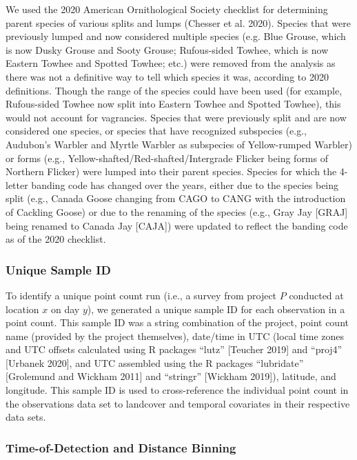 \documentclass[]{article}
\begin{document}
We used the 2020 American Ornithological Society checklist for determining parent species of various splits and lumps (Chesser et al. 2020). Species that were previously lumped and now considered multiple species (e.g. Blue Grouse, which is now Dusky Grouse and Sooty Grouse; Rufous-sided Towhee, which is now Eastern Towhee and Spotted Towhee; etc.) were removed from the analysis as there was not a definitive way to tell which species it was, according to 2020 definitions. Though the range of the species could have been used (for example, Rufous-sided Towhee now split into Eastern Towhee and Spotted Towhee), this would not account for vagrancies. Species that were previously split and are now considered one species, or species that have recognized subspecies (e.g., Audubon’s Warbler and Myrtle Warbler as subspecies of Yellow-rumped Warbler) or forms (e.g., Yellow-shafted/Red-shafted/Intergrade Flicker being forms of Northern Flicker) were lumped into their parent species. Species for which the 4-letter banding code has changed over the years, either due to the species being split (e.g., Canada Goose changing from CAGO to CANG with the introduction of Cackling Goose) or due to the renaming of the species (e.g., Gray Jay [GRAJ] being renamed to Canada Jay [CAJA]) were updated to reflect the banding code as of the 2020 checklist.

\subsubsection{Unique Sample ID}
To identify a unique point count run (i.e., a survey from project $P$ conducted at location $x$ on day $y$), we generated a unique sample ID for each observation in a point count. This sample ID was a string combination of the project, point count name (provided by the project themselves), date/time in UTC (local time zones and UTC offsets calculated using R packages “lutz” [Teucher 2019] and “proj4” [Urbanek 2020], and UTC assembled using the R packages “lubridate” [Grolemund and Wickham 2011] and “stringr” [Wickham 2019]), latitude, and longitude. This sample ID is used to cross-reference the individual point count in the observations data set to landcover and temporal covariates in their respective data sets.

\subsubsection{Time-of-Detection and Distance Binning}
\end{document}
